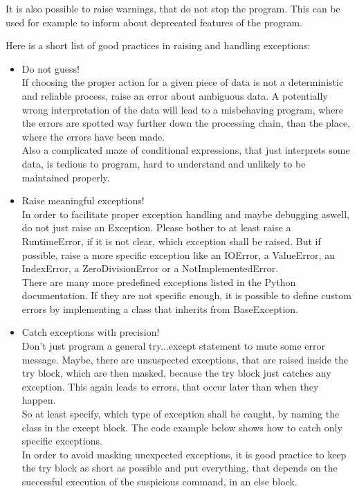 		It is also possible to raise warnings, that do not stop the program.
		This can be used for example to inform about deprecated features of the program.

		Here is a short list of good practices in raising and handling exceptions:
		\begin{itemize}
			\item Do not guess!\\
			      If choosing the proper action for a given piece of data is not a deterministic and reliable process, raise an error about ambiguous data.
			      A potentially wrong interpretation of the data will lead to a misbehaving program, where the errors are spotted way further down the processing chain, than the place, where the errors have been made.\\
			      Also a complicated maze of conditional expressions, that just interprets some data, is tedious to program, hard to understand and unlikely to be maintained properly.
			\item Raise meaningful exceptions!\\
			      In order to facilitate proper exception handling and maybe debugging aswell, do not just raise an {\normalfont \ttfamily Exception}.
			      Please bother to at least raise a {\normalfont \ttfamily RuntimeError}, if it is not clear, which exception shall be raised.
			      But if possible, raise a more specific exception like an {\normalfont \ttfamily IOError}, a {\normalfont \ttfamily ValueError}, an {\normalfont \ttfamily IndexError}, a {\normalfont \ttfamily ZeroDivisionError} or a {\normalfont \ttfamily NotImplementedError}.\\
			      There are many more predefined exceptions listed in the Python documentation.
			      If they are not specific enough, it is possible to define custom errors by implementing a class that inherits from {\normalfont \ttfamily BaseException}.
			\item Catch exceptions with precision!\\
			      Don't just program a general {\normalfont \ttfamily try...except} statement to mute some error message.
			      Maybe, there are unsuspected exceptions, that are raised inside the {\normalfont \ttfamily try} block, which are then masked, because the {\normalfont \ttfamily try} block just catches any exception.
			      This again leads to errors, that occur later than when they happen.\\
			      So at least specify, which type of exception shall be caught, by naming the class in the {\normalfont \ttfamily except} block.
			      The code example below shows how to catch only specific exceptions.\\
			      In order to avoid masking unexpected exceptions, it is good practice to keep the {\normalfont \ttfamily try} block as short as possible and put everything, that depends on the successful execution of the suspicious command, in an {\normalfont \ttfamily else} block.
		\end{itemize}

